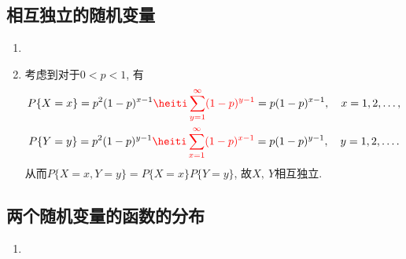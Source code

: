 \subsection{相互独立的随机变量}
\setcounter{prob}{16}
\begin{prob}
	\begin{enumerate}
	\item 	
	\item
	考虑到对于$0<p<1$, 有
	\begin{gather*}
		P\{X=x\}=p^2(1-p)^{x-1}\red{\sum_{y=1}^\infty (1-p)^{y-1}}=p(1-p)^{x-1},\quad x=1,2,\ldots,\\
		P\{Y=y\}=p^2(1-p)^{y-1}\red{\sum_{x=1}^\infty (1-p)^{x-1}}=p(1-p)^{y-1},\quad y=1,2,\ldots.
	\end{gather*}
	从而$P\{X=x,Y=y\}=P\{X=x\}P\{Y=y\}$, 故$X,~Y$相互独立.
	\end{enumerate}
\end{prob}
\subsection{两个随机变量的函数的分布}
\setcounter{prob}{20}
\begin{prob}
	\begin{enumerate}
	\item 
	\end{enumerate}
\end{prob}